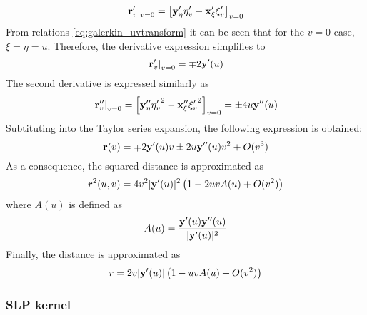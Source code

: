 \begin{equation}
	\left.{\bf r}'_v\right|_{v=0} = \left[{\bf y}'_{\eta} \eta'_v - {\bf x}'_{\xi} \xi'_v\right]_{v=0}
\end{equation}
%
From relations \eqref{eq:galerkin_uvtransform} it can be seen that for the $v=0$ case, $\xi = \eta = u$.
Therefore, the derivative expression simplifies to
%
\begin{equation}
	\left.{\bf r}'_v\right|_{v=0} = \mp 2 {\bf y}'(u) 
\end{equation}
%
The second derivative is expressed similarly as
%
\begin{equation}
	\left.{\bf r}''_v\right|_{v=0}
	=
	\left[
		{\bf y}''_\eta {\eta'_v}^2 - {\bf x}''_{\xi} {\xi'_v}^2
	\right]_{v=0}
	= \pm 4u {\bf y}''(u)
\end{equation}
%
Subtituting into the Taylor series expansion, the following expression is obtained:
%
\begin{equation}
	{\bf r}(v) = \mp 2 {\bf y}'(u) v 
	\pm 2u {\bf y}''(u) v^2 
	+ O(v^3)
\end{equation}
%
As a consequence, the squared distance is approximated as
%
\begin{equation}
	r^2(u,v) = 
	4v^2 |{\bf y}'(u)|^2
	\left(
	1
	-
	2 u v A(u)
	+ O(v^2)
	\right)
\end{equation}
%
where $A(u)$ is defined as
%
\begin{equation}
	A(u) = \frac{{\bf y}'(u) {\bf y}''(u)}{|{\bf y}'(u)|^2}
\end{equation}
%
Finally, the distance is approximated as
%
\begin{equation}
	r = 2v|{\bf y}'(u)| \left(1 - u v A(u) + O(v^2) \right)
	\label{eq:galerkin_face_taylor_r}
\end{equation}

\subsubsection{SLP kernel}

